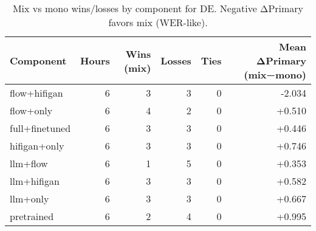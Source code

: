 \begin{table}[htbp!]
\centering
\small
\begin{tabular}{lrrrrr}
\toprule
Component & Hours & Wins (mix) & Losses & Ties & Mean ΔPrimary (mix−mono) \\
\midrule
flow+hifigan & 6 & 3 & 3 & 0 & -2.034 \\
flow+only & 6 & 4 & 2 & 0 & +0.510 \\
full+finetuned & 6 & 3 & 3 & 0 & +0.446 \\
hifigan+only & 6 & 3 & 3 & 0 & +0.746 \\
llm+flow & 6 & 1 & 5 & 0 & +0.353 \\
llm+hifigan & 6 & 3 & 3 & 0 & +0.582 \\
llm+only & 6 & 3 & 3 & 0 & +0.667 \\
pretrained & 6 & 2 & 4 & 0 & +0.995 \\
\bottomrule
\end{tabular}
\caption{Mix vs mono wins/losses by component for DE. Negative ΔPrimary favors mix (WER-like).}
\label{tab:mix-vs-mono-winloss-de}
\end{table}
